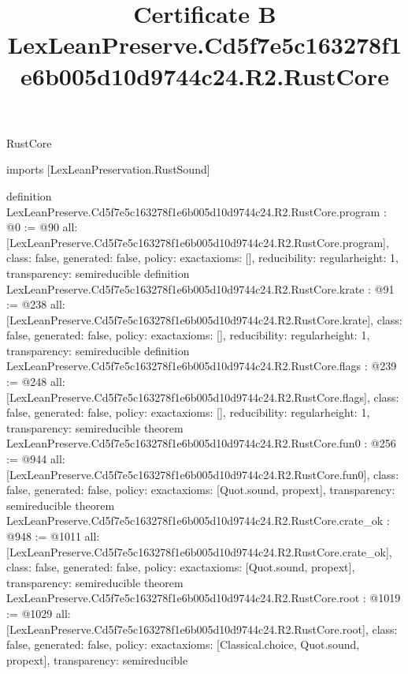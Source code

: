 \begin{lexlean}{RustCore}
\title{Certificate B LexLeanPreserve.Cd5f7e5c163278f1e6b005d10d9744c24.R2.RustCore}
\begin{coremodule}
imports [LexLeanPreservation.RustSound]

definition LexLeanPreserve.Cd5f7e5c163278f1e6b005d10d9744c24.R2.RustCore.program : @0 := @90 {
  all: [LexLeanPreserve.Cd5f7e5c163278f1e6b005d10d9744c24.R2.RustCore.program],
  class: false,
  generated: false,
  policy: exact{axioms: []},
  reducibility: regular{height: 1},
  transparency: semireducible
}
definition LexLeanPreserve.Cd5f7e5c163278f1e6b005d10d9744c24.R2.RustCore.krate : @91 := @238 {
  all: [LexLeanPreserve.Cd5f7e5c163278f1e6b005d10d9744c24.R2.RustCore.krate],
  class: false,
  generated: false,
  policy: exact{axioms: []},
  reducibility: regular{height: 1},
  transparency: semireducible
}
definition LexLeanPreserve.Cd5f7e5c163278f1e6b005d10d9744c24.R2.RustCore.flags : @239 := @248 {
  all: [LexLeanPreserve.Cd5f7e5c163278f1e6b005d10d9744c24.R2.RustCore.flags],
  class: false,
  generated: false,
  policy: exact{axioms: []},
  reducibility: regular{height: 1},
  transparency: semireducible
}
theorem LexLeanPreserve.Cd5f7e5c163278f1e6b005d10d9744c24.R2.RustCore.fun0 : @256 := @944 {
  all: [LexLeanPreserve.Cd5f7e5c163278f1e6b005d10d9744c24.R2.RustCore.fun0],
  class: false,
  generated: false,
  policy: exact{axioms: [Quot.sound, propext]},
  transparency: semireducible
}
theorem LexLeanPreserve.Cd5f7e5c163278f1e6b005d10d9744c24.R2.RustCore.crate_ok : @948 := @1011 {
  all: [LexLeanPreserve.Cd5f7e5c163278f1e6b005d10d9744c24.R2.RustCore.crate_ok],
  class: false,
  generated: false,
  policy: exact{axioms: [Quot.sound, propext]},
  transparency: semireducible
}
theorem LexLeanPreserve.Cd5f7e5c163278f1e6b005d10d9744c24.R2.RustCore.root : @1019 := @1029 {
  all: [LexLeanPreserve.Cd5f7e5c163278f1e6b005d10d9744c24.R2.RustCore.root],
  class: false,
  generated: false,
  policy: exact{axioms: [Classical.choice, Quot.sound, propext]},
  transparency: semireducible
}


\end{coremodule}
\end{lexlean}
